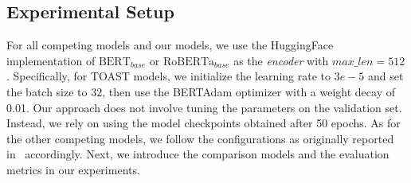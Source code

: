\documentclass[a4paper]{cas-sc}
\newcommand{\1}[1]{\mathds{1}\left[#1\right]}
\newcommand{\ZY}[1]{\textcolor{red}{Zhiyi: #1}}
\begin{document}





\subsection{Experimental Setup}
\label{sec:setup}
For all competing models and our models, we use the HuggingFace implementation of $\text{BERT}_{base}$ or $\text{RoBERTa}_{base}$ as the \emph{encoder} with $max\_len=512$. 
Specifically, for TOAST models, we initialize the learning rate to $3e-5$ and set the batch size to $32$, then use the BERTAdam optimizer with a weight decay of 0.01. 
Our approach does not involve tuning the parameters on the validation set. Instead, we rely on using the model checkpoints obtained after 50 epochs.
As for the other competing models, we follow the configurations as originally reported  in~\citep{segal2020simple,li2022multispanqa,lee2023liquid} accordingly. 
Next, we introduce the comparison models and the evaluation metrics in our experiments. 
\end{document}

